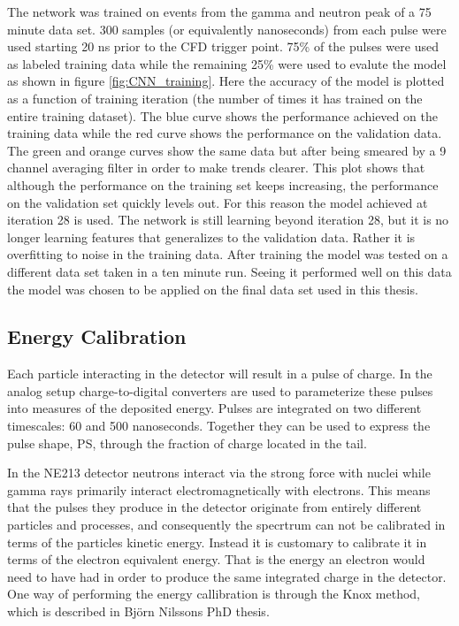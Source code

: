 \documentclass[main.tex]{subfiles}
\begin{document}
The network was trained on events from the gamma and neutron peak of a 75 minute data set. 300 samples (or equivalently nanoseconds) from each pulse were used starting 20 ns prior to the CFD trigger point. 75\% of the pulses were used as labeled training data while the remaining 25\% were used to evalute the model as shown in figure \ref{fig:CNN_training}. Here the accuracy of the model is plotted as a function of training iteration (the number of times it has trained on the entire training dataset). The blue curve shows the performance achieved on the training data while the red curve shows the performance on the validation data. The green and orange curves show the same data but after being smeared by a 9 channel averaging filter in order to make trends clearer. This plot shows that although the performance on the training set keeps increasing, the performance on the validation set quickly levels out. For this reason the model achieved at iteration 28 is used. The network is still learning beyond iteration 28, but it is no longer learning features that generalizes to the validation data. Rather it is overfitting to noise in the training data. After training the model was tested on a different data set taken in a ten minute run. Seeing it performed well on this data the model was chosen to be applied on the final data set used in this thesis.


\subsection{Energy Calibration}
Each particle interacting in the detector will result in a pulse of charge. In the analog setup charge-to-digital converters are used to parameterize these pulses into measures of the deposited energy. Pulses are integrated on two different timescales: 60 and 500 nanoseconds. Together they can be used to express the pulse shape, PS, through the fraction of charge located in the tail.

In the NE213 detector neutrons interact via the strong force with nuclei while gamma rays primarily interact electromagnetically with electrons. This means that the pulses they produce in the detector originate from entirely different particles and processes, and consequently the specrtrum can not be calibrated in terms of the particles kinetic energy. Instead it is customary to calibrate it in terms of the electron equivalent energy. That is the energy an electron would need to have had in order to produce the same integrated charge in the detector. One way of performing the energy callibration is through the Knox method, which is described in Björn Nilssons PhD thesis\cite[pg. 55]{Nilsson}.
\end{document}
